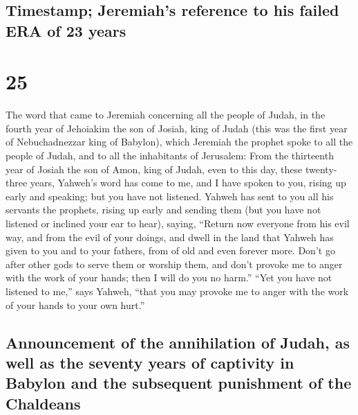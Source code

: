 \hypertarget{timestamp-jeremiahs-reference-to-his-failed-era-of-23-years}{%
\subsection{Timestamp; Jeremiah's reference to his failed ERA of 23
years}\label{timestamp-jeremiahs-reference-to-his-failed-era-of-23-years}}

\hypertarget{section-24}{%
\section{25}\label{section-24}}

 The word that came to Jeremiah concerning all the people
of Judah, in the fourth year of Jehoiakim the son of Josiah, king of
Judah (this was the first year of Nebuchadnezzar king of Babylon),
 which Jeremiah the prophet spoke to all the people of
Judah, and to all the inhabitants of Jerusalem:  From the
thirteenth year of Josiah the son of Amon, king of Judah, even to this
day, these twenty-three years, Yahweh's word has come to me, and I have
spoken to you, rising up early and speaking; but you have not listened.
 Yahweh has sent to you all his servants the prophets,
rising up early and sending them (but you have not listened or inclined
your ear to hear),  saying, ``Return now everyone from his
evil way, and from the evil of your doings, and dwell in the land that
Yahweh has given to you and to your fathers, from of old and even
forever more.  Don't go after other gods to serve them or
worship them, and don't provoke me to anger with the work of your hands;
then I will do you no harm.''  ``Yet you have not listened
to me,'' says Yahweh, ``that you may provoke me to anger with the work
of your hands to your own hurt.''

\hypertarget{announcement-of-the-annihilation-of-judah-as-well-as-the-seventy-years-of-captivity-in-babylon-and-the-subsequent-punishment-of-the-chaldeans}{%
\subsection{Announcement of the annihilation of Judah, as well as the
seventy years of captivity in Babylon and the subsequent punishment of
the
Chaldeans}\label{announcement-of-the-annihilation-of-judah-as-well-as-the-seventy-years-of-captivity-in-babylon-and-the-subsequent-punishment-of-the-chaldeans}}

